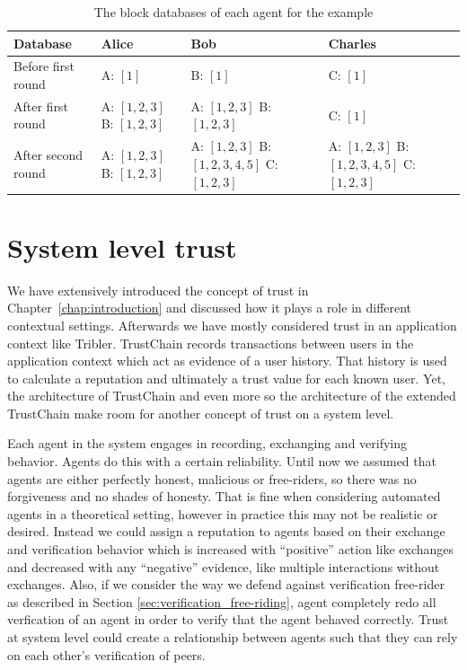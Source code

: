 \begin{table}[h!]
    \centering
    \caption{The block databases of each agent for the example}
    \label{tab:blocks_example}
    \begin{tabular}{p{4cm}|p{3cm}|p{4cm}|p{3cm}}
        \toprule
        Database & Alice & Bob & Charles \\
        \midrule
        Before first round & A: $[1]$ & B: $[1]$ & C: $[1]$ \\ \hline 
        After first round & A: $[1, 2, 3]$ \newline B: $[1, 2, 3]$ & A: $[1, 2, 3]$ \newline B: $[1, 2, 3]$ & C: $[1]$ \\ \hline
        After second round &  A: $[1, 2, 3]$ \newline B: $[1, 2, 3]$ & A: $[1, 2, 3]$ \newline B: $[1, 2, 3, 4, 5]$ \newline C: $[1, 2, 3]$ & A: $[1, 2, 3]$ \newline B: $[1, 2, 3, 4, 5]$ \newline C: $[1, 2, 3]$ \\
        \bottomrule
    \end{tabular}
\end{table}

\section{System level trust}
We have extensively introduced the concept of trust in Chapter~\ref{chap:introduction} and discussed
how it plays a role in different contextual settings. Afterwards we have mostly considered trust in 
an application context like Tribler. TrustChain records transactions between users in the application
context which act as evidence of a user history. That history is used to calculate a reputation and
ultimately a trust value for each known user. Yet, the architecture of TrustChain and even more so 
the architecture of the extended TrustChain make room for another concept of trust on a system level.

Each agent in the system engages in recording, exchanging and verifying behavior. Agents do this 
with a certain reliability. Until now we assumed that agents are either perfectly honest, malicious
or free-riders, so there was no forgiveness and no shades of honesty. That is fine when considering
automated agents in a theoretical setting, however in practice this may not be realistic or 
desired. Instead we could assign a reputation to agents based on their exchange and verification 
behavior which is increased with ``positive'' action like exchanges and decreased with any 
``negative'' evidence, like multiple interactions without exchanges. Also, if we consider the way 
we defend against verification free-rider as described in Section \ref{sec:verification_free-riding}, 
agent completely redo all verfication of an agent in order to verify that the agent behaved correctly.
Trust at system level could create a relationship between agents such that they can rely on each 
other's verification of peers. 

